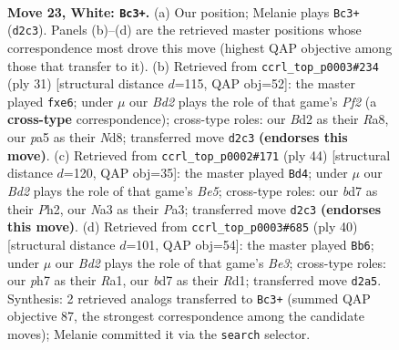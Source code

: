 \documentclass[11pt]{article}
\begin{document}
\clearpage

\begin{figure}[p]\centering
\begin{subfigure}{0.46\textwidth}\centering
\resizebox{\linewidth}{!}{%
\newchessgame
\chessboard[
  setfen={r3r3/1ppb1pkp/8/p2p2b1/6P1/NP2Pn2/P2B1P1q/RN2RK2 w - - 0 23},
  showmover=false,
  pgfstyle=straightmove, color=movearrow, markmove={d2-c3}
]}
\caption{}
\end{subfigure}\hfill
\begin{subfigure}{0.46\textwidth}\centering
\resizebox{\linewidth}{!}{%
\newchessgame
\chessboard[
  setfen={r2nk2r/pp1b1pbp/3pP1p1/8/8/1PPB1N1P/3B1PP1/R3R1K1 b kq - 0 16},
  showmover=false,
  pgfstyle=straightmove, color=movearrow, markmove={f7-e6}
]}
\caption{}
\end{subfigure}
\\[4pt]
\begin{subfigure}{0.46\textwidth}\centering
\resizebox{\linewidth}{!}{%
\newchessgame
\chessboard[
  setfen={2b2rk1/4p2p/pp4p1/2rPB3/2n1P3/P1NR4/1P4PP/4K2R w K - 1 23},
  showmover=false,
  pgfstyle=straightmove, color=movearrow, markmove={e5-d4}
]}
\caption{}
\end{subfigure}\hfill
\begin{subfigure}{0.46\textwidth}\centering
\resizebox{\linewidth}{!}{%
\newchessgame
\chessboard[
  setfen={r5k1/1p2bpp1/2r1b3/P3p2p/2P3n1/1N2B1P1/3NPP1P/R2R2K1 w - - 4 21},
  showmover=false,
  pgfstyle=straightmove, color=movearrow, markmove={e3-b6}
]}
\caption{}
\end{subfigure}
\caption{\textbf{Move 23, White: \texttt{Bc3+}.} (a) Our position; Melanie plays \texttt{Bc3+} (\texttt{d2c3}). Panels (b)--(d) are the retrieved master positions whose correspondence most drove this move (highest QAP objective among those that transfer to it). (b) Retrieved from \texttt{ccrl\_top\_p0003\#234} (ply 31) [structural distance $d$=115, QAP obj=52]: the master played \texttt{fxe6}; under $\mu$ our \emph{Bd2} plays the role of that game's \emph{Pf2} (a \textbf{cross-type} correspondence); cross-type roles: our \emph{B}d2 as their \emph{R}a8, our \emph{p}a5 as their \emph{N}d8; transferred move \texttt{d2c3} \textbf{(endorses this move)}. (c) Retrieved from \texttt{ccrl\_top\_p0002\#171} (ply 44) [structural distance $d$=120, QAP obj=35]: the master played \texttt{Bd4}; under $\mu$ our \emph{Bd2} plays the role of that game's \emph{Be5}; cross-type roles: our \emph{b}d7 as their \emph{P}h2, our \emph{N}a3 as their \emph{P}a3; transferred move \texttt{d2c3} \textbf{(endorses this move)}. (d) Retrieved from \texttt{ccrl\_top\_p0003\#685} (ply 40) [structural distance $d$=101, QAP obj=54]: the master played \texttt{Bb6}; under $\mu$ our \emph{Bd2} plays the role of that game's \emph{Be3}; cross-type roles: our \emph{p}h7 as their \emph{R}a1, our \emph{b}d7 as their \emph{R}d1; transferred move \texttt{d2a5}. Synthesis: 2 retrieved analogs transferred to \texttt{Bc3+} (summed QAP objective 87, the strongest correspondence among the candidate moves); Melanie committed it via the \texttt{search} selector.}
\label{fig:thought-m44}
\end{figure}
\end{document}
